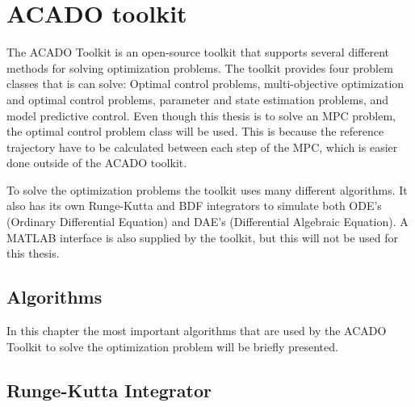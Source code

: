 \section{ACADO toolkit}

The ACADO Toolkit is an open-source toolkit that supports several different methods for solving optimization problems. The toolkit provides four problem classes that is can solve: Optimal control problems, multi-objective optimization and optimal control problems, parameter and state estimation problems, and model predictive control. Even though this thesis is to solve an MPC problem, the optimal control problem class will be used. This is because the reference trajectory have to be calculated between each step of the MPC, which is easier done outside of the ACADO toolkit.

To solve the optimization problems the toolkit uses many different algorithms. It also has its own Runge-Kutta and BDF integrators to simulate both ODE's (Ordinary Differential Equation) and DAE's (Differential Algebraic Equation). A MATLAB interface is also supplied by the toolkit, but this will not be used for this thesis.


\subsection{Algorithms}

In this chapter the most important algorithms that are used by the ACADO Toolkit to solve the optimization problem will be briefly presented.


\subsection{Runge-Kutta Integrator}